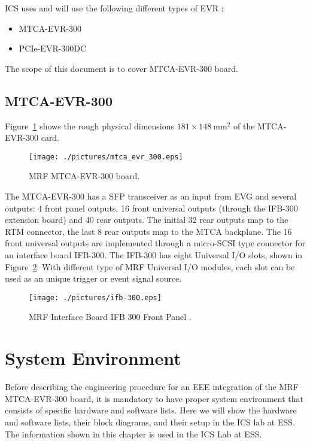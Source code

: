 \documentclass[11pt
  , a4paper
  , article
  , oneside
  , showtrims
]{memoir}
\begin{document}
ICS uses and will use the following different types of EVR :
\begin{itemize}
\item MTCA-EVR-300
\item PCIe-EVR-300DC
\end{itemize}

The scope of this document is to cover MTCA-EVR-300 board.


\section{MTCA-EVR-300}
Figure~\ref{fig:mtca-evr300} shows the rough physical dimensions $181\times 148~\mathrm{mm}{}^2$ of the MTCA-EVR-300 card.

\begin{figure}[!htb]
  \centering
  \texttt{[image: ./pictures/mtca\_evr\_300.eps]}
  \caption{
    MRF MTCA-EVR-300 board.
  }
  \label{fig:mtca-evr300}   
\end{figure}


The MTCA-EVR-300  has a SFP transceiver as an input from EVG and several outputs: 4 front panel outputs, 16 front universal outputs (through the IFB-300 extension board) and 40 rear outputs. The initial 32 rear outputs map to the RTM connector, the last 8 rear outputs map to the MTCA backplane. The 16 front universal outputs are implemented through a micro-SCSI type connector for an interface board IFB-300. The IFB-300 has eight Universal I/O slots, shown in Figure~\ref{fig:ifb-300}. With different type of MRF Universal I/O modules, each slot can be used as an unique trigger or event signal source.

\begin{figure}[!htb]
  \centering
  \texttt{[image: ./pictures/ifb-300.eps]}
  \caption{
    MRF Interface Board IFB 300 Front Panel \cite{MRFEVENTSYSTEMDC}.
  }
  \label{fig:ifb-300}   
\end{figure}


\clearpage

\chapter{System Environment}
Before describing the engineering procedure for an EEE integration of the MRF MTCA-EVR-300 board, it is mandatory to have proper system environment that consists of specific hardware and software lists. Here we will show the hardware and software lists, their block diagrams, and their setup in the ICS lab at ESS. The information shown in this chapter is used in the ICS Lab at ESS.
\end{document}
